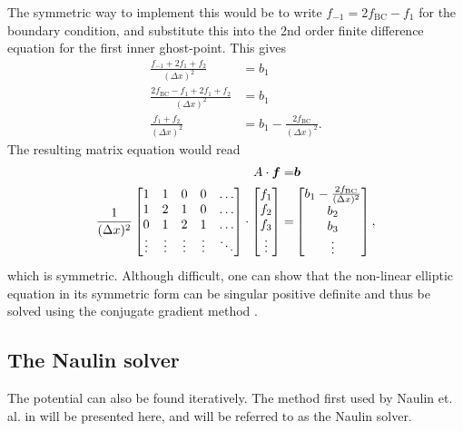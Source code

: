 The symmetric way to implement this would be to write $f_{-1}=2f_{\text{BC}}-f_{1}$ for the boundary condition, and substitute this into the 2nd order finite difference equation for the first inner ghost-point.
This gives
%
\begin{align*}
    \frac{f_{-1}+2f_{1}+f_{2}}{(\Delta x)^2}&=b_1\\
    \frac{2f_{\text{BC}}-f_{1}+2f_{1}+f_{2}}{(\Delta x)^2}&=b_1\\
    \frac{f_{1}+f_{2}}{(\Delta x)^2}&=b_1 - \frac{2f_{\text{BC}}}{(\Delta x)^2}.
\end{align*}
%
The resulting matrix equation would read
%
\begin{align*}
    A\cdot\boldsymbol{f}=&\boldsymbol{b}\\
    \frac{1}{(\Delta x)^2}
    \begin{bmatrix}
        1                       & 1                       & 0 & 0 & \ldots\\
        1                       & 2                       & 1 & 0 & \ldots\\
        0                       & 1                       & 2 & 1 & \ldots\\
        \vdots                  & \vdots              &\vdots&\vdots&\ddots\\
    \end{bmatrix}
    \cdot
    \begin{bmatrix}
        f_{1}\\
        f_{2}\\
        f_{3}\\
        \vdots
    \end{bmatrix}
    =&
    \begin{bmatrix}
        b_{1} - \frac{2f_{\text{BC}}}{(\Delta x)^2}\\
        b_{2}\\
        b_{3}\\
        \vdots
    \end{bmatrix},
\end{align*}
%
which is symmetric.
Although difficult, one can show that the non-linear elliptic equation in its symmetric form can be singular positive definite and thus be solved using the conjugate gradient method \cite{Saad2003book}.

\subsection{The Naulin solver}
\label{sec:NaulinSolver}
%
The potential can also be found iteratively.
The method first used by Naulin et. al. in \cite{Naulin2008} will be presented here, and will be referred to as the Naulin solver.


